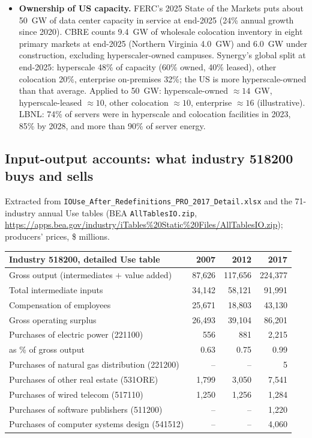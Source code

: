 \documentclass[11pt]{article}
\begin{document}
\begin{itemize}
  \item \textbf{Ownership of US capacity.} FERC's 2025 State of the Markets puts about 50~GW of data center capacity in service at end-2025 (24\% annual growth since 2020). CBRE counts 9.4~GW of wholesale colocation inventory in eight primary markets at end-2025 (Northern Virginia 4.0~GW) and 6.0~GW under construction, excluding hyperscaler-owned campuses. Synergy's global split at end-2025: hyperscale 48\% of capacity (60\% owned, 40\% leased), other colocation 20\%, enterprise on-premises 32\%; the US is more hyperscale-owned than that average. Applied to 50~GW: hyperscale-owned $\approx 14$~GW, hyperscale-leased $\approx 10$, other colocation $\approx 10$, enterprise $\approx 16$ (illustrative). LBNL: 74\% of servers were in hyperscale and colocation facilities in 2023, 85\% by 2028, and more than 90\% of server energy.
\end{itemize}

\subsection{Input-output accounts: what industry 518200 buys and sells}\label{sec:io}
Extracted from \texttt{IOUse\_After\_Redefinitions\_PRO\_2017\_Detail.xlsx} and the 71-industry annual Use tables (BEA \texttt{AllTablesIO.zip}, \url{https://apps.bea.gov/industry/iTables%20Static%20Files/AllTablesIO.zip}); producers' prices, \$ millions.

\begin{center}\small
\begin{tabular}{lrrr}
\toprule
Industry 518200, detailed Use table & 2007 & 2012 & 2017 \\
\midrule
Gross output (intermediates $+$ value added) & 87{,}626 & 117{,}656 & 224{,}377 \\
Total intermediate inputs & 34{,}142 & 58{,}121 & 91{,}991 \\
Compensation of employees & 25{,}671 & 18{,}803 & 43{,}130 \\
Gross operating surplus & 26{,}493 & 39{,}104 & 86{,}201 \\
\addlinespace
Purchases of electric power (221100) & 556 & 881 & 2{,}215 \\
\quad as \% of gross output & 0.63 & 0.75 & 0.99 \\
Purchases of natural gas distribution (221200) & -- & -- & 5 \\
Purchases of other real estate (531ORE) & 1{,}799 & 3{,}050 & 7{,}541 \\
Purchases of wired telecom (517110) & 1{,}250 & 1{,}256 & 1{,}284 \\
Purchases of software publishers (511200) & -- & -- & 1{,}220 \\
Purchases of computer systems design (541512) & -- & -- & 4{,}060 \\
\bottomrule
\end{tabular}
\end{center}
\end{document}
